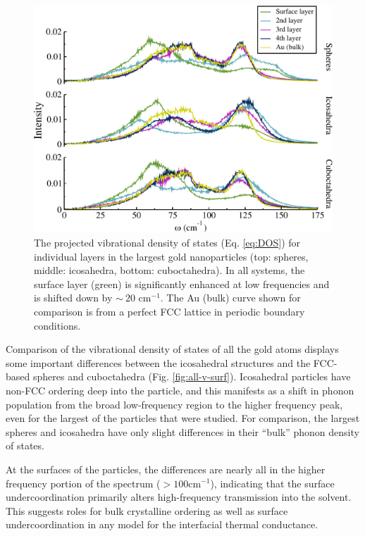 
\begin{figure}
	\includegraphics[width=\linewidth]{figures/col-layer40.pdf}
	\caption{The projected vibrational density of states
          (Eq. \ref{eq:DOS}) for individual layers in the largest gold
          nanoparticles (top: spheres, middle: icosahedra, bottom:
          cuboctahedra). In all systems, the surface layer (green) is
          significantly enhanced at low frequencies and is shifted
          down by $\sim~20\text{~cm}^{-1}$. The Au (bulk) curve shown
          for comparison is from a perfect FCC lattice in periodic
          boundary conditions.}
	\label{fig:layer}
\end{figure}

Comparison of the vibrational density of states of all the gold atoms
displays some important differences between the icosahedral structures
and the FCC-based spheres and cuboctahedra
(Fig. \ref{fig:all-v-surf}).  Icosahedral particles have non-FCC
ordering deep into the particle, and this manifests as a shift in
phonon population from the broad low-frequency region to the higher
frequency peak, even for the largest of the particles that were
studied.  For comparison, the largest spheres and icosahedra have only
slight differences in their ``bulk'' phonon density of states.

At the surfaces of the particles, the differences are nearly all in
the higher frequency portion of the spectrum ($>100 \text{cm}^{-1}$),
indicating that the surface undercoordination primarily alters
high-frequency transmission into the solvent.  This suggests roles for
bulk crystalline ordering as well as surface undercoordination in any
model for the interfacial thermal conductance.

